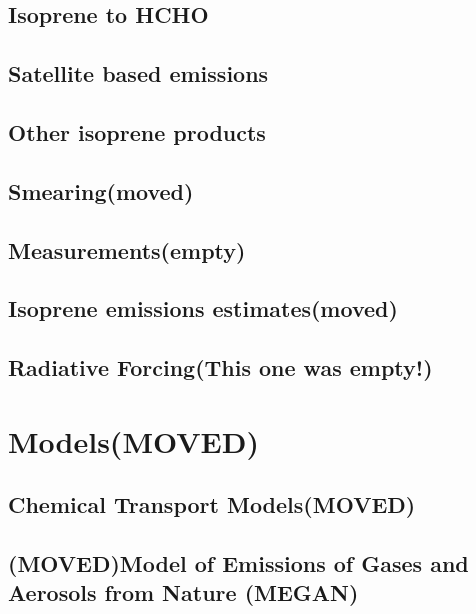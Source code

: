   \subsection{Isoprene to HCHO}
    \label{ch_LitRev:sec:IsopFromHCHO}
    
  \subsection{Satellite based emissions}
    
  \subsection{Other isoprene products}
  \subsection{Smearing(moved)}
  \label{ch_LitRev:sec:smearing}
    
  \subsection{Measurements(empty)}
    
  \subsection{Isoprene emissions estimates(moved)}
    
  \subsection{Radiative Forcing(This one was empty!)}

\section{Models(MOVED)}
\label{ch_LitRev:sec:models}
  \subsection{Chemical Transport Models(MOVED)}
  \subsection{(MOVED)Model of Emissions of Gases and Aerosols from Nature (MEGAN)}
    \label{Ch_LitRev:sec:MEGAN}
